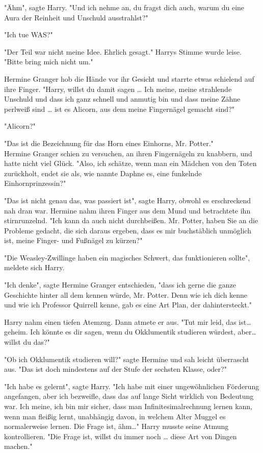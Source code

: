 {"Ähm", sagte Harry. "Und ich nehme an, du fragst dich auch, warum du eine Aura der Reinheit und Unschuld ausstrahlst?"

"Ich tue WAS?"

"Der Teil war nicht meine Idee. Ehrlich gesagt." Harrys Stimme wurde leise. "Bitte bring mich nicht um."

Hermine Granger hob die Hände vor ihr Gesicht und starrte etwas schielend auf ihre Finger. "Harry, willst du damit sagen … Ich meine, meine strahlende Unschuld und dass ich ganz schnell und anmutig bin und dass meine Zähne perlweiß sind … ist es Alicorn, aus dem meine Fingernägel gemacht sind?"

"Alicorn?"

"Das ist die Bezeichnung für das Horn eines Einhorns, Mr. Potter."\\ Hermine Granger schien zu versuchen, an ihren Fingernägeln zu knabbern, und hatte nicht viel Glück. "Also, ich schätze, wenn man ein Mädchen von den Toten zurückholt, endet sie als, wie nannte Daphne es, eine funkelnde Einhornprinzessin?"

"Das ist nicht genau das, was passiert ist", sagte Harry, obwohl es erschreckend nah dran war. Hermine nahm ihren Finger aus dem Mund und betrachtete ihn stirnrunzelnd. "Ich kann da auch nicht durchbeißen. Mr. Potter, haben Sie an die Probleme gedacht, die sich daraus ergeben, dass es mir buchstäblich unmöglich ist, meine Finger- und Fußnägel zu kürzen?"

"Die Weasley-Zwillinge haben ein magisches Schwert, das funktionieren sollte", meldete sich Harry.

"Ich denke", sagte Hermine Granger entschieden, "dass ich gerne die ganze Geschichte hinter all dem kennen würde, Mr. Potter. Denn wie ich dich kenne und wie ich Professor Quirrell kenne, gab es eine Art Plan, der dahintersteckt."

Harry nahm einen tiefen Atemzug. Dann atmete er aus. "Tut mir leid, das ist… geheim. Ich könnte es dir sagen, wenn du Okklumentik studieren würdest, aber… willst du das?"

"Ob ich Okklumentik studieren will?" sagte Hermine und sah leicht überrascht aus. "Das ist doch mindestens auf der Stufe der sechsten Klasse, oder?"

"Ich habe es gelernt", sagte Harry. "Ich habe mit einer ungewöhnlichen Förderung angefangen, aber ich bezweifle, dass das auf lange Sicht wirklich von Bedeutung war. Ich meine, ich bin mir sicher, dass man Infinitesimalrechnung lernen kann, wenn man fleißig lernt, unabhängig davon, in welchem Alter Muggel es normalerweise lernen. Die Frage ist, ähm…" Harry musste seine Atmung kontrollieren. "Die Frage ist, willst du immer noch … diese Art von Dingen machen."

}
